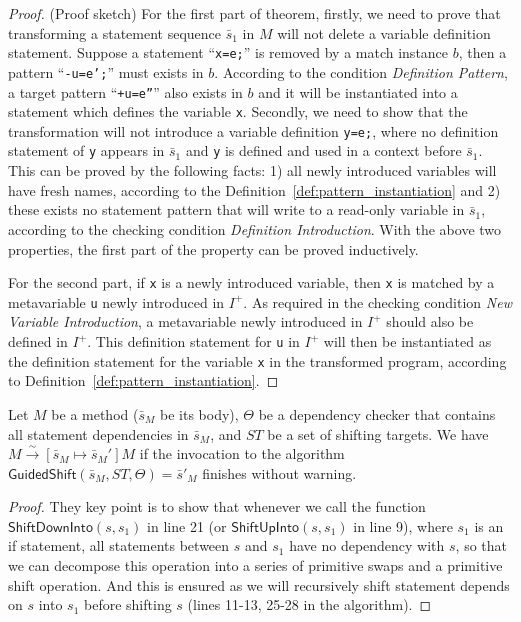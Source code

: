 \documentclass[letterpaper, USenglish]{lipics-v2016}
\newcommand{\code}[1]{\texttt{\footnotesize #1}}
\theoremstyle{plain}
\begin{document}
\begin{proof} (Proof sketch) For the first part of theorem, firstly, we need to prove that transforming a statement sequence $\bar{s}_1$ in $M$ will not delete a variable definition statement. Suppose a statement ``\code{x=e;}'' is removed by a match instance $b$, then a pattern ``\code{-u=e';}'' must exists in $b$. According to the condition \textit{Definition Pattern}, a target pattern ``\code{+u=e''}'' also exists in $b$ and it will be instantiated into a statement which defines the variable \code{x}. Secondly, we need to show that the transformation will not introduce a variable definition \code{y=e;}, where no definition statement of \code{y} appears in $\bar{s}_1$ and \code{y} is defined and used in a context before $\bar{s}_1$. This can be proved by the following facts: 1) all newly introduced variables will have fresh names, according to the Definition~\ref{def:pattern_instantiation} and 2) these exists no statement pattern that will write to a read-only variable in $\bar{s}_1$, according to the checking condition \textit{Definition Introduction}. With the above two properties, the first part of the property can be proved inductively.

For the second part, if \code{x} is a newly introduced variable, then \code{x} is matched by a metavariable \code{u} newly introduced in $I^+$. As required in the checking condition \textit{New Variable Introduction}, a metavariable newly introduced in $I^+$ should also be defined in $I^+$. This definition statement for \code{u} in $I^+$ will then be instantiated as the definition statement for the variable \code{x} in the transformed program, according to Definition~\ref{def:pattern_instantiation}.
\end{proof}

\begin{prop}
Let $M$ be a method ($\bar{s}_M$ be its body), $\Theta$ be a dependency
checker that contains all statement dependencies in $\bar{s}_M$, and
$\mathit{ST}$ be a set of shifting targets. We have
$M\xrightarrow{\sim}[\bar{s}_M\mapsto\bar{s}_M']M$ if the invocation
to the algorithm
$\mathsf{GuidedShift}(\bar{s}_M,\mathit{ST},\Theta)=\bar{s}'_M$
finishes without warning.  
\end{prop}
\begin{proof}They key point is to show that whenever we call the function $\mathsf{ShiftDownInto}(s, s_1)$ in line 21 (or $\mathsf{ShiftUpInto}(s, s_1)$ in line 9), where $s_1$ is an if statement, all statements between $s$ and $s_1$ have no dependency with $s$, so that we can decompose this operation into a series of primitive swaps and a primitive shift operation. And this is ensured as we will recursively shift statement depends on $s$ into $s_1$ before shifting $s$ (lines 11-13, 25-28 in the algorithm).
\end{proof}
\end{document}

